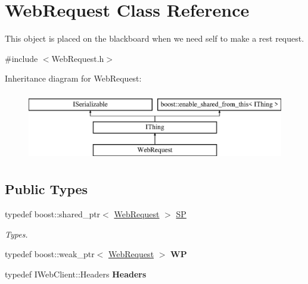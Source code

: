 \hypertarget{class_web_request}{}\section{Web\+Request Class Reference}
\label{class_web_request}


This object is placed on the blackboard when we need self to make a rest request.  




{\ttfamily \#include $<$Web\+Request.\+h$>$}

Inheritance diagram for Web\+Request\+:\begin{figure}[H]
\begin{center}
\leavevmode
\includegraphics[height=3.000000cm]{class_web_request}
\end{center}
\end{figure}
\subsection*{Public Types}
\begin{DoxyCompactItemize}
\item 
\mbox{\label{class_web_request_ae4da60cb53e0462fa8022b2de57f2f94}} 
typedef boost\+::shared\+\_\+ptr$<$ \hyperlink{class_web_request}{Web\+Request} $>$ \hyperlink{class_web_request_ae4da60cb53e0462fa8022b2de57f2f94}{SP}
\begin{DoxyCompactList}\small\item\em Types. \end{DoxyCompactList}\item 
\mbox{\label{class_web_request_a6a9b770840b2a82793b39f0fae99c48a}} 
typedef boost\+::weak\+\_\+ptr$<$ \hyperlink{class_web_request}{Web\+Request} $>$ {\bfseries WP}
\item 
\mbox{\label{class_web_request_a1d967c8c13747bb33e2cc41457696008}} 
typedef I\+Web\+Client\+::\+Headers {\bfseries Headers}
\end{DoxyCompactItemize}
